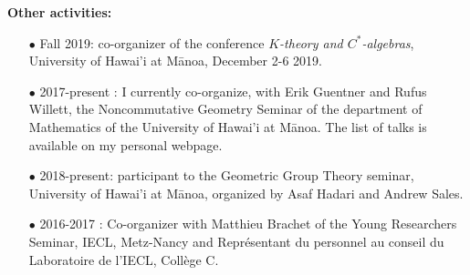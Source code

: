 \documentclass[a4paper,11pt]{article}
\begin{document}
\textbf{Other activities:} 
\begin{itemize}
\item[$\bullet$] Fall 2019: co-organizer of the conference \textit{$K$-theory and $C^*$-algebras}, University of Hawai'i at M\={a}noa, December 2-6 2019. 
\item[$\bullet$] 2017-present : I currently co-organize, with Erik Guentner and Rufus Willett, the Noncommutative Geometry Seminar of the department of Mathematics of the University of Hawai'i at M\={a}noa. The list of talks is available on my personal webpage.
\item[$\bullet$] 2018-present: participant to the Geometric Group Theory seminar, University of Hawai'i at M\={a}noa, organized by Asaf Hadari and Andrew Sales.
\item[$\bullet$] 2016-2017 : Co-organizer with Matthieu Brachet of the Young Researchers Seminar, IECL, Metz-Nancy and Représentant du personnel au conseil du Laboratoire de l'IECL, Collège C.
\end{itemize}
\end{document}
